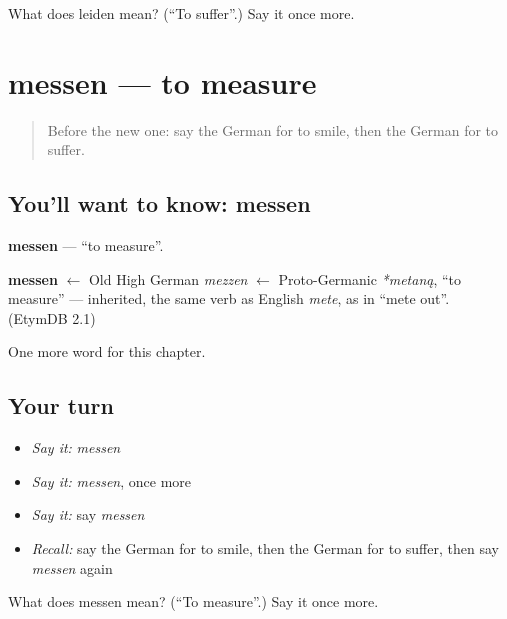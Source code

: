 \begin{tcolorbox}[breakable,colback=teal!4,colframe=teal!35!black,title={Before you move on}]
What does leiden mean? (\textquotedblleft{}To suffer\textquotedblright{}.) Say it once more.
\end{tcolorbox}
\section[messen]{messen — to measure}

\label{lesson:GE-C183-messen}



\begin{quote}
Before the new one: say the German for to smile, then the German for to suffer.
\end{quote}

\subsection*{You'll want to know: messen}
\textbf{messen} — \textquotedblleft{}to measure\textquotedblright{}.

\begin{cousinweb}
\textbf{messen} $\leftarrow$ Old High German \emph{mezzen} $\leftarrow$ Proto-Germanic \emph{*metaną}, \textquotedblleft{}to measure\textquotedblright{} — inherited, the same verb as English \emph{mete}, as in \textquotedblleft{}mete out\textquotedblright{}. (EtymDB 2.1)
\end{cousinweb}

\begin{grammarlens}[title={What you've built}]
One more word for this chapter.
\end{grammarlens}

\subsection*{Your turn}
\begin{itemize}
\raggedright
  \item \emph{Say it:} \emph{messen}
  \item \emph{Say it:} \emph{messen}, once more
  \item \emph{Say it:} say \emph{messen}
  \item \emph{Recall:} say the German for to smile, then the German for to suffer, then say \emph{messen} again
\end{itemize}

\begin{tcolorbox}[breakable,colback=teal!4,colframe=teal!35!black,title={Before you move on}]
What does messen mean? (\textquotedblleft{}To measure\textquotedblright{}.) Say it once more.
\end{tcolorbox}
